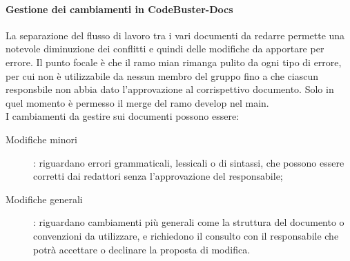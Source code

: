 \paragraph{Gestione dei cambiamenti in CodeBuster-Docs}
La separazione del flusso di lavoro tra i vari documenti da redarre permette una notevole diminuzione dei conflitti e quindi delle modifiche da apportare per errore. Il punto focale è che il ramo mian rimanga pulito da ogni tipo di errore, per cui non è utilizzabile da nessun membro del gruppo fino a che ciascun responsbile non abbia dato l'approvazione al corrispettivo documento. Solo in quel momento è permesso il merge del ramo develop nel main. \\
I cambiamenti da gestire sui documenti possono essere:
\begin{description}
	\item[Modifiche minori] : riguardano errori grammaticali, lessicali o di sintassi, che possono essere corretti dai redattori senza l'approvazione del responsabile;
	\item[Modifiche generali] : riguardano cambiamenti più generali come la struttura del documento o convenzioni da utilizzare, e richiedono il consulto con il responsabile che potrà accettare o declinare la proposta di modifica.
\end{description} 











